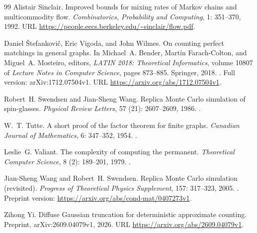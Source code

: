 \documentclass[11pt]{article}
\theoremstyle{definition}
\theoremstyle{remark}
\numberwithin{equation}{section}
\begin{document}
\begin{thebibliography}{99}
Alistair Sinclair.
\newblock Improved bounds for mixing rates of Markov chains and
  multicommodity flow.
\newblock \emph{Combinatorics, Probability and Computing}, 1:
  351--370, 1992.
\newblock URL \url{https://people.eecs.berkeley.edu/~sinclair/flow.pdf}.

Daniel {\v S}tefankovi{\v c}, Eric Vigoda, and John Wilmes.
\newblock On counting perfect matchings in general graphs.
\newblock In Michael~A. Bender, Mart{\'i}n Farach-Colton, and Miguel~A.
  Mosteiro, editors, \emph{LATIN 2018: Theoretical Informatics}, volume 10807
  of \emph{Lecture Notes in Computer Science}, pages 873--885. Springer, 2018.
\newblock {}.
\newblock Full version: arXiv:1712.07504v1.
\newblock URL \url{https://arxiv.org/abs/1712.07504v1}.

Robert~H. Swendsen and Jian-Sheng Wang.
\newblock Replica Monte Carlo simulation of spin-glasses.
\newblock \emph{Physical Review Letters}, 57
  (21): 2607--2609, 1986.
\newblock {}.

W.~T. Tutte.
\newblock A short proof of the factor theorem for finite graphs.
\newblock \emph{Canadian Journal of Mathematics}, 6: 347--352, 1954.
\newblock {}.

Leslie~G. Valiant.
\newblock The complexity of computing the permanent.
\newblock \emph{Theoretical Computer Science}, 8 (2):
  189--201, 1979.
\newblock {}.

Jian-Sheng Wang and Robert~H. Swendsen.
\newblock Replica Monte Carlo simulation (revisited).
\newblock \emph{Progress of Theoretical Physics Supplement}, 157:
  317--323, 2005.
\newblock {}.
\newblock Preprint version: \url{https://arxiv.org/abs/cond-mat/0407273v1}.

Zihong Yi.
\newblock Diffuse Gaussian truncation for deterministic approximate counting.
\newblock Preprint, arXiv:2609.04079v1, 2026.
\newblock URL \url{https://arxiv.org/abs/2609.04079v1}.

\end{thebibliography}
\end{document}
